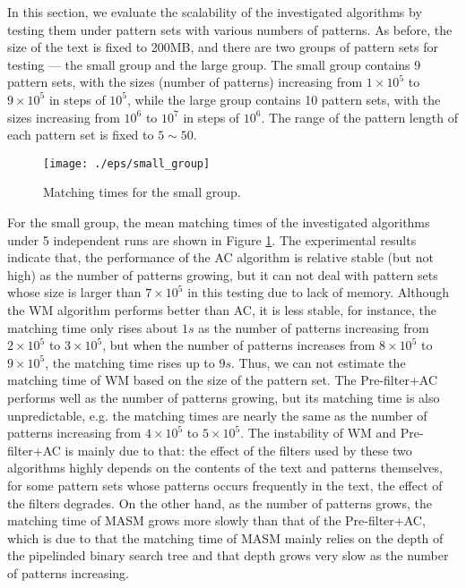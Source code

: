 \documentclass{article}
\begin{document}
In this section, we evaluate the scalability of the investigated
algorithms by testing them under pattern sets with various numbers of
patterns. As before, the size of the text is fixed to 200MB, and there
are two groups of pattern sets for testing --- the small group and the
large group. The small group contains 9 pattern sets, with the sizes
(number of patterns) increasing from $1 \times 10^5$ to
$9 \times 10^5$ in steps of $10^5$, while the large group contains 10
pattern sets, with the sizes increasing from $10^6$ to $10^7$ in steps
of $10^6$. The range of the pattern length of each pattern set is
fixed to $5 \sim 50$.

\begin{figure}[htbp]
  \centering
  \texttt{[image: ./eps/small\_group]}
  \caption{Matching times for the small group.}
  \label{fig:small_group}
\end{figure}

For the small group, the mean matching times of the investigated
algorithms under 5 independent runs are shown in Figure
\ref{fig:small_group}. The experimental results indicate that, the
performance of the \textsf{AC} algorithm is relative stable (but not
high) as the number of patterns growing, but it can not deal with
pattern sets whose size is larger than $7 \times 10^5$ in this testing
due to lack of memory. Although the \textsf{WM} algorithm performs
better than \textsf{AC}, it is less stable, for instance, the matching
time only rises about $1s$ as the number of patterns increasing from
$2 \times 10^5$ to $3 \times 10^5$, but when the number of patterns
increases from $8 \times 10^5$ to $9 \times 10^5$, the matching time
rises up to $9s$. Thus, we can not estimate the matching time of
\textsf{WM} based on the size of the pattern set. The
\textsf{Pre-filter+AC} performs well as the number of patterns
growing, but its matching time is also unpredictable, e.g. the
matching times are nearly the same as the number of patterns
increasing from $4 \times 10^5$ to $5 \times 10^5$. The instability of
\textsf{WM} and \textsf{Pre-filter+AC} is mainly due to that: the
effect of the filters used by these two algorithms highly depends on
the contents of the text and patterns themselves, for some pattern
sets whose patterns occurs frequently in the text, the effect of the
filters degrades. On the other hand, as the number of patterns grows,
the matching time of \textsf{MASM} grows more slowly than that of the
\textsf{Pre-filter+AC}, which is due to that the matching time of
\textsf{MASM} mainly relies on the depth of the pipelinded binary
search tree and that depth grows very slow as the number of patterns
increasing.
\end{document}
